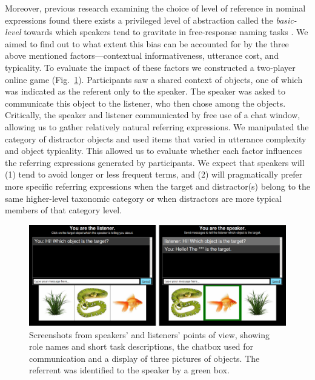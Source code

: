 \documentclass[10pt,letterpaper]{article}
\newcommand{\figref}[1]{Fig.~\ref{#1}}
\begin{document}

Moreover, previous research examining the choice of level of reference in nominal expressions found there exists a privileged level of abstraction called the \emph{basic-level} towards which speakers tend to gravitate in free-response naming tasks \cite{RoschEtAl76_BasicLevel}. We aimed to find out to what extent this bias can be accounted for by the three above mentioned factors---contextual informativeness, utterance cost, and typicality. To evaluate the impact of these factors we constructed a two-player online game (\figref{fig:procedure}). Participants saw a shared context of objects, one of which was indicated as the referent only to the speaker. The speaker was asked to communicate this object to the listener, who then chose among the objects. Critically, the speaker and listener communicated by free use of a chat window, allowing us to gather relatively natural referring expressions. We manipulated the category of distractor objects and used items that varied in utterance complexity and object typicality. This allowed us to evaluate whether each factor influences the referring expressions generated by participants. We expect that speakers will (1) tend to avoid longer or less frequent terms, and (2) will pragmatically prefer more specific referring expressions when the target and distractor(s) belong to the same higher-level taxonomic category or when distractors are more typical members of that category level.

\begin{figure}[tb]
\centering
\includegraphics[width=.5\textwidth]{graphs/procedure}
\caption{Screenshots from speakers' and listeners' points of view, showing role names and short task descriptions, the chatbox used for communication and a display of three pictures of objects. The referrent was identified to the speaker by a green box.}
\label{fig:procedure}
\end{figure}
\end{document}
